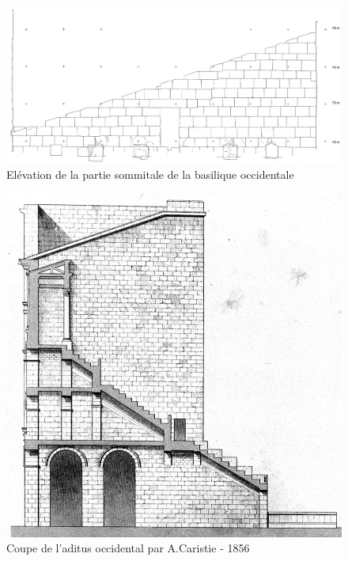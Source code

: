 \begin{figure}[!h]
	\includegraphics[width=\linewidth]{images/grenierOcci}
	\caption[Elévation de la partie sommitale de la basilique occidentale]{Elévation de la partie sommitale de la basilique occidentale \cite[Pl. XLVI]{orangePl}}
	\label{grenier} 
\end{figure} 

\begin{figure}[!h]
	\includegraphics[width=\linewidth]{images/colonneCaristie}
	\caption[Coupe de l'\gls{aditus} occidental par A.Caristie - 1856]{Coupe de l'\gls{aditus} occidental par A.Caristie - 1856 \cite[Pl. VI]{orangePl}}
	\label{colonneCaristie} 
\end{figure}

